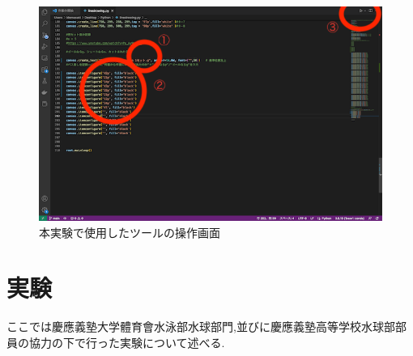\documentclass[../main.tex]{subfiles}
\begin{document}
\begin{figure}[ht]
    \begin{center}
        \includegraphics{img/03.png}
        \caption{本実験で使用したツールの操作画面}
        \label{img:screen}
    \end{center}
\end{figure}



\section{実験}
ここでは慶應義塾大学體育會水泳部水球部門,並びに慶應義塾高等学校水球部部員の協力の下で行った実験について述べる.
\end{document}
